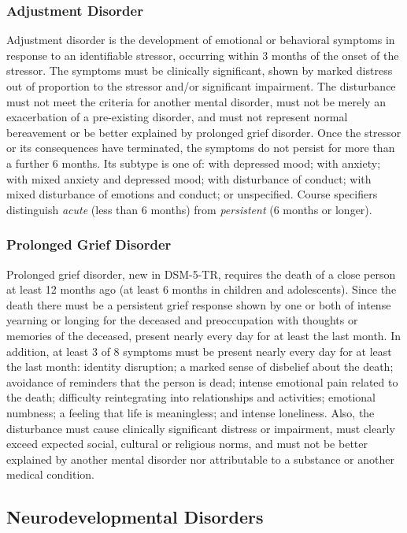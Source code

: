 \subsubsection{Adjustment Disorder}

Adjustment disorder is the development of emotional or behavioral symptoms in
response to an identifiable stressor, occurring within 3 months of the
onset of the stressor. The symptoms must be clinically significant, shown by
marked distress out of proportion to the stressor and/or significant impairment.
The disturbance must not meet the criteria for another mental disorder, must not
be merely an exacerbation of a pre-existing disorder, and must not represent
normal bereavement or be better explained by prolonged grief disorder. Once the
stressor or its consequences have terminated, the symptoms do not persist for
more than a further 6 months. Its subtype is one of: with depressed
mood; with anxiety; with mixed anxiety and depressed mood; with disturbance of
conduct; with mixed disturbance of emotions and conduct; or unspecified. Course
specifiers distinguish \emph{acute} (less than 6 months) from \emph{persistent}
(6 months or longer).

\subsubsection{Prolonged Grief Disorder}

Prolonged grief disorder, new in DSM-5-TR, requires the death of a close person
at least 12 months ago (at least 6 months in children and
adolescents). Since the death there must be a persistent grief response shown by
one or both of intense yearning or longing for the deceased and
preoccupation with thoughts or memories of the deceased, present nearly every day
for at least the last month. In addition, at least 3 of 8 symptoms must
be present nearly every day for at least the last month: identity disruption; a
marked sense of disbelief about the death; avoidance of reminders that the person
is dead; intense emotional pain related to the death; difficulty reintegrating
into relationships and activities; emotional numbness; a feeling that life is
meaningless; and intense loneliness. Also, the disturbance must cause clinically
significant distress or impairment, must clearly exceed expected social, cultural
or religious norms, and must not be better explained by another mental disorder
nor attributable to a substance or another medical condition.

\subsection{Neurodevelopmental Disorders}

